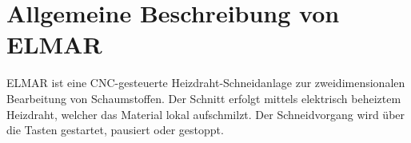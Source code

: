 %
%

\chapter{Allgemeine Beschreibung von ELMAR}
ELMAR ist eine CNC-gesteuerte Heizdraht-Schneidanlage zur
zweidimensionalen Bearbeitung von Schaumstoffen.
Der Schnitt erfolgt mittels elektrisch beheiztem Heizdraht,
welcher das Material lokal aufschmilzt.
Der Schneidvorgang wird über die Tasten gestartet, pausiert oder gestoppt. 
